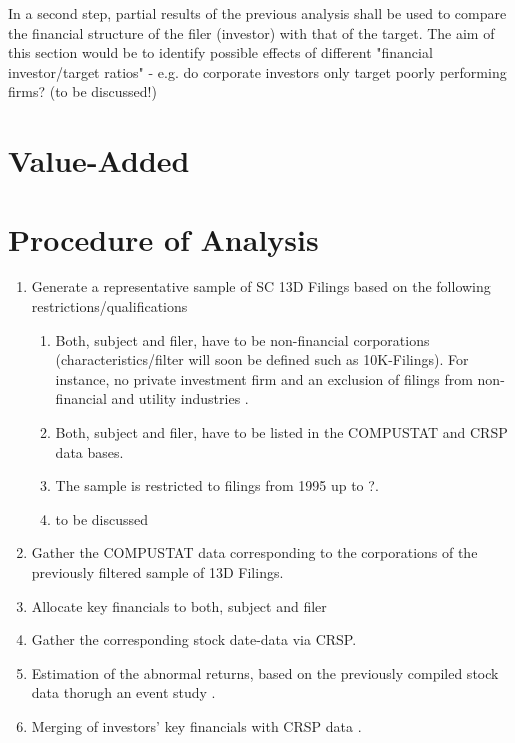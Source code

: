 \documentclass[12pt]{article}
\begin{document}
In a second step, partial results of the previous analysis shall be used to compare the financial structure of the filer (investor) with that of the target. The aim of this section would be to identify possible effects of different "financial investor/target ratios" - e.g. do corporate investors only target poorly performing firms? (to be discussed!)

\section{Value-Added}

\section{Procedure of Analysis}

\begin{enumerate}
\item Generate a representative sample of SC 13D Filings based on the following restrictions/qualifications
	
	\begin{enumerate}
	\item Both, subject and filer, have to be non-financial corporations (characteristics/filter will soon be defined such as 10K-Filings). For instance, no private investment firm and an exclusion of filings from non-financial and utility industries \citep{Brigida2012}.
 	\item Both, subject and filer, have to be listed in the COMPUSTAT and CRSP data bases.
	\item The sample is restricted to filings from 1995 up to ?.
	\item to be discussed
	\end{enumerate}
	
\item Gather the COMPUSTAT data corresponding to the corporations of the previously filtered sample of 13D Filings.
\item Allocate key financials to both, subject and filer
\item Gather the corresponding stock date-data via CRSP.
\item Estimation of the abnormal returns, based on the previously compiled stock data thorugh an event study \citep{ang2011} \citep{Fama1992} \citep{Kolari2010}. 
\item Merging of investors' key financials with CRSP data \citep{Fama1992}.

\end{enumerate}

\pagebreak
\printbibliography[title=Relevant Literature]
\end{document}
